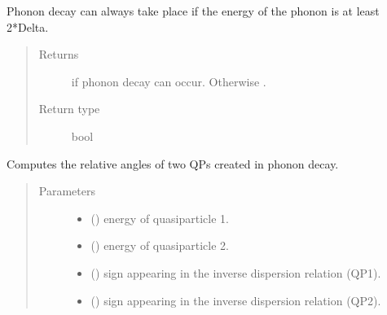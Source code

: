 \documentclass[letterpaper,10pt,english]{sphinxmanual}
\begin{document}
\begin{fulllineitems}
\begin{fulllineitems}
Phonon decay can always take place if the energy of the phonon is at
least 2*Delta.
\begin{quote}\begin{description}
\item[{Returns}] \leavevmode
{} if phonon decay can occur. Otherwise .

\item[{Return type}] \leavevmode
bool

\end{description}\end{quote}

\end{fulllineitems}


\begin{fulllineitems}
\label{\detokenize{code_structure:scdc.interaction.PhononDecayToQuasiparticles.decay_angles}}
Computes the relative angles of two QPs created in phonon decay.
\begin{quote}\begin{description}
\item[{Parameters}] \leavevmode\begin{itemize}
\item {} 
 () \textendash{} energy of quasiparticle 1.

\item {} 
 () \textendash{} energy of quasiparticle 2.

\item {} 
 () \textendash{} sign appearing in the inverse dispersion relation (QP1).

\item {} 
 () \textendash{} sign appearing in the inverse dispersion relation (QP2).

\end{itemize}


\end{description}
\end{quote}
\end{fulllineitems}
\end{fulllineitems}
\end{document}
